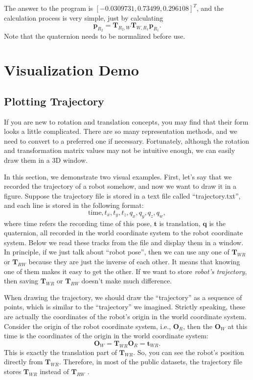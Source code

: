 The answer to the program is $ [- 0.0309731, 0.73499, 0.296108 ]^T$, and the calculation process is very simple, just by calculating $$ \mathbf{p}_{R_2} = \mathbf{T}_{ R_2, W} \mathbf{T}_{W, R_1} \mathbf{p}_{R_1}. $$ Note that the quaternion needs to be normalized before use.

\section{Visualization Demo}
\subsection{Plotting Trajectory}
If you are new to rotation and translation concepts, you may find that their form looks a little complicated. There are so many representation methods, and we need to convert to a preferred one if necessary. Fortunately, although the rotation and transformation matrix values may not be intuitive enough, we can easily draw them in a 3D window.

In this section, we demonstrate two visual examples. First, let's say that we recorded the trajectory of a robot somehow, and now we want to draw it in a figure. Suppose the trajectory file is stored in a text file called ``trajectory.txt'', and each line is stored in the following format: $$ \mathrm {time}, t_x, t_y, t_z, q_x, q_y, q_z, q_w, $$ where $ \mathrm {time} $ refers the recording time of this pose, $ \mathbf {t} $ is translation, $ \mathbf {q} $ is the quaternion, all recorded in the world coordinate system to the robot coordinate system. Below we read these tracks from the file and display them in a window. In principle, if we just talk about ``robot pose'', then we can use any one of $ \mathbf {T}_{WR} $ or $ \mathbf {T}_{RW} $ because they are just the inverse of each other. It means that knowing one of them makes it easy to get the other. If we want to store \textit {robot's trajectory}, then saving $ \mathbf {T}_{WR} $ or $ \mathbf {T}_{RW} $ doesn't make much difference.

When drawing the trajectory, we should draw the ``trajectory'' as a sequence of points, which is similar to the ``trajectory'' we imagined. Strictly speaking, these are actually the coordinates of the robot's origin in the world coordinate system. Consider the origin of the robot coordinate system, i.e., $ \mathbf {O}_{R}$, then the $ \mathbf{O}_{W}$ at this time is the coordinates of the origin in the world coordinate system:
\begin{equation}
\mathbf{O} _ {W} = \mathbf{T} _ {WR} \mathbf {O} _R = \mathbf {t} _ {WR}.
\end{equation}
This is exactly the translation part of $ \mathbf {T}_{WR} $. So, you can see the robot's position directly from $ \mathbf {T}_{WR} $. Therefore, in most of the public datasets, the trajectory file stores $ \mathbf {T}_{WR} $ instead of $ \mathbf {T}_{RW} $ .

